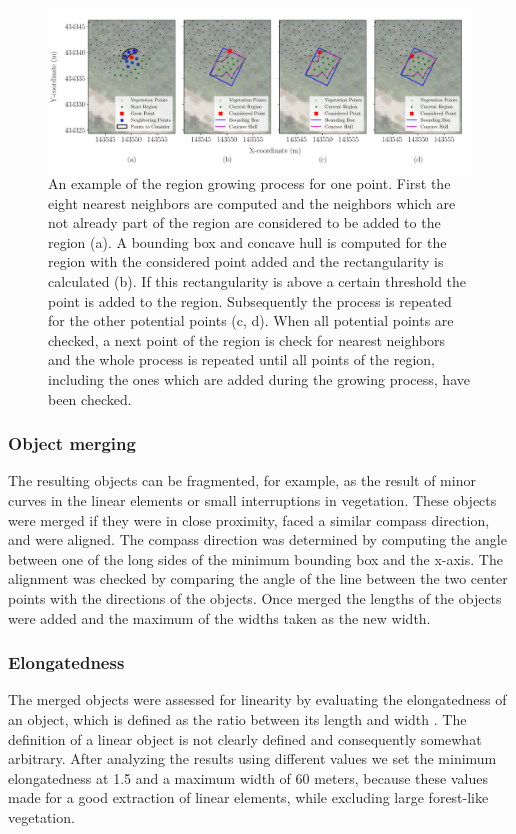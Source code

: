 \begin{figure}
	\centering
	\includegraphics[width=\columnwidth]{./img/region_growing.pdf}
	\caption{An example of the region growing process for one point. First the eight nearest neighbors are computed and the neighbors which are not already part of the region are considered to be added to the region (a). A bounding box and concave hull is computed for the region with the considered point added and the rectangularity is calculated (b). If this rectangularity is above a certain threshold the point is added to the region. Subsequently the process is repeated for the other potential points (c, d). When all potential points are checked, a next point of the region is check for nearest neighbors and the whole process is repeated until all points of the region, including the ones which are added during the growing process, have been checked.}
	\label{fig:regiongrowing}
\end{figure}

\subsubsection{Object merging}
The resulting objects can be fragmented, for example, as the result of minor curves in the linear elements or small interruptions in vegetation. These objects were merged if they were in close proximity, faced a similar compass direction, and were aligned. The compass direction was determined by computing the angle between one of the long sides of the minimum bounding box and the x-axis. The alignment was checked by comparing the angle of the line between the two center points with the directions of the objects. Once merged the lengths of the objects were added and the maximum of the widths taken as the new width.

\subsubsection{Elongatedness}
The merged objects were assessed for linearity by evaluating the elongatedness of an object, which is defined as the ratio between its length and width \citep{nagao2013structural}. The definition of a linear object is not clearly defined and consequently somewhat arbitrary. After analyzing the results using different values we set the minimum elongatedness at 1.5 and a maximum width of 60 meters, because these values made for a good extraction of linear elements, while excluding large forest-like vegetation.

